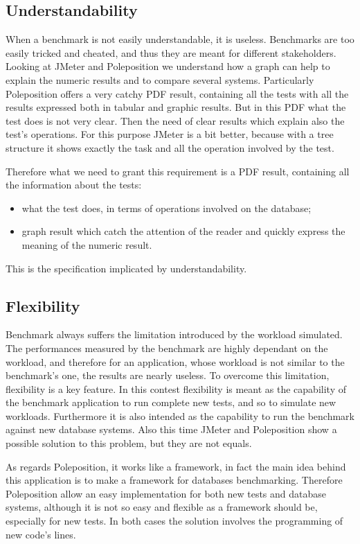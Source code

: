 		\subsection{Understandability}
When a benchmark is not easily understandable, it is useless. Benchmarks are too easily tricked and cheated, and thus they are meant for different stakeholders. Looking at JMeter and Poleposition we understand how a graph can help to explain the numeric results and to compare several systems. Particularly Poleposition offers a very catchy PDF result, containing all the tests with all the results expressed both in tabular and graphic results. But in this PDF what the test does is not very clear. Then the need of clear results which explain also the test's operations. For this purpose JMeter is a bit better, because with a tree structure it shows exactly the task and all the operation involved by the test.

Therefore what we need to grant this requirement is a PDF result, containing all the information about the tests: 
\begin{itemize}
	\item what the test does, in terms of operations involved on the database;
	\item graph result which catch the attention of the reader and quickly express the meaning of the numeric result.
\end{itemize}
This is the specification implicated by understandability.
			 
		\subsection{Flexibility}
Benchmark always suffers the limitation introduced by the workload simulated. The performances measured by the benchmark are highly dependant on the workload, and therefore for an application, whose workload is not similar to the benchmark's one, the results are nearly useless. To overcome this limitation, flexibility is a key feature. In this contest flexibility is meant as the capability of the benchmark application to run complete new tests, and so to simulate new workloads. Furthermore it is also intended as the capability to run the benchmark against new database systems. Also this time JMeter and Poleposition show a possible solution to this problem, but they are not equals.

As regards Poleposition, it works like a framework, in fact the main idea behind this application is to make a framework for databases benchmarking. Therefore Poleposition allow an easy implementation for both new tests and database systems, although it is not so easy and flexible as a framework should be, especially for new tests. In both cases the solution involves the programming of new code's lines.

